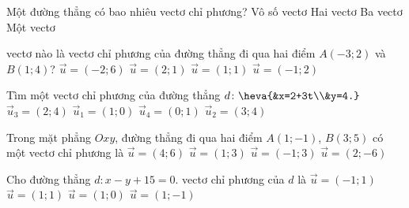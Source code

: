 \begin{ex}%
	Một đường thẳng có bao nhiêu vectơ chỉ phương?
	\choice
	{\True Vô số vectơ}
	{Hai vectơ}
	{Ba vectơ}
	{Một vectơ}
\end{ex}


\begin{ex}%
	vectơ nào là vectơ chỉ phương của đường thẳng đi qua hai điểm $A(-3;2)$ và $B(1;4)$?
	\choice
	{$\overrightarrow{u}=(-2;6)$}
	{\True $\overrightarrow{u}=(2;1)$}
	{$\overrightarrow{u}=(1;1)$}
	{$\overrightarrow{u}=(-1;2)$}
\end{ex}


\begin{ex}%
	Tìm một vectơ chỉ phương của đường thẳng $d \colon \heva{&x=2+3t\\&y=4.}$
	\choice
	{$\overrightarrow{u}_3=(2;4)$}
	{\True $\overrightarrow{u}_1=(1;0)$}
	{$\overrightarrow{u}_4=(0;1)$}
	{$\overrightarrow{u}_2=(3;4)$}
\end{ex}


\begin{ex}%
	Trong mặt phẳng $Oxy$, đường thẳng đi qua hai điểm $A(1;-1)$, $B(3;5)$ có một vectơ chỉ phương là
	\choice
	{$\overrightarrow{u}=(4;6)$}
	{\True $\overrightarrow{u}=(1;3)$}
	{$\overrightarrow{u}=(-1;3)$}
	{$\overrightarrow{u}=(2;-6)$}
\end{ex}


\begin{ex}%
	Cho đường thẳng $d\colon x-y+15=0$. vectơ chỉ phương của $d$ là
	\choice
	{$\overrightarrow{u}=(-1;1)$}
	{\True $\overrightarrow{u}=(1;1)$}
	{$\overrightarrow{u}=(1;0)$}
	{$\overrightarrow{u}=(1;-1)$}
\end{ex}


